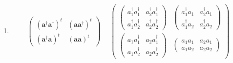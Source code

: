 \documentclass[aps,preprint]{revtex4}
\begin{document}
\begin{enumerate}
\item 
\begin{equation}
\left( 
\begin{array}{cc}
\left( \boldsymbol{a}^{\dagger }\boldsymbol{a}^{\dagger }\right) ^{t} & 
\left( \boldsymbol{aa}^{\dagger }\right) ^{t} \\ 
\left( \boldsymbol{a}^{\dagger }\boldsymbol{a}\right) ^{t} & \left( 
\boldsymbol{aa}\right) ^{t}%
\end{array}%
\right) =\left( 
\begin{array}{cc}
\left( 
\begin{array}{cc}
a_{1}^{\dagger }a_{1}^{\dagger } & a_{2}^{\dagger }a_{1}^{\dagger } \\ 
a_{1}^{\dagger }a_{2}^{\dagger } & a_{2}^{\dagger }a_{2}^{\dagger }%
\end{array}%
\right) & \left( 
\begin{array}{cc}
a_{1}^{\dagger }a_{1} & a_{2}^{\dagger }a_{1} \\ 
a_{1}^{\dagger }a_{2} & a_{2}^{\dagger }a_{2}%
\end{array}%
\right) \\ 
\left( 
\begin{array}{cc}
a_{1}a_{1}^{\dagger } & a_{2}a_{1}^{\dagger } \\ 
a_{1}a_{2}^{\dagger } & a_{2}a_{2}^{\dagger }%
\end{array}%
\right) & \left( 
\begin{array}{cc}
a_{1}a_{1} & a_{2}a_{1} \\ 
a_{1}a_{2} & a_{2}a_{2}%
\end{array}%
\right)%
\end{array}%
\right)
\end{equation}


\end{enumerate}
\end{document}
